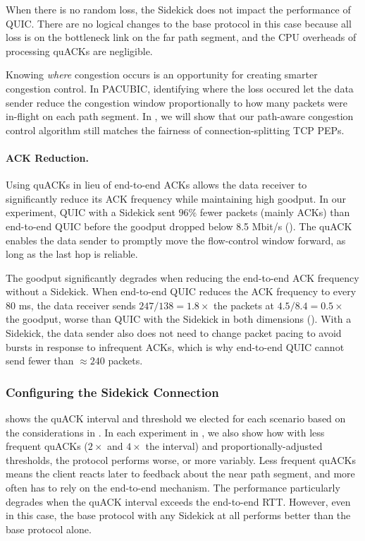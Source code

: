 When there is no random loss, the Sidekick does not impact the performance
of QUIC\@.
There are no logical changes to the base protocol in this case because all loss
is on the
bottleneck link on the far path segment, and the CPU overheads of processing quACKs
are negligible.

Knowing \emph{where} congestion occurs is an opportunity for creating smarter
congestion control. In PACUBIC, identifying where the loss occured let the data
sender reduce the congestion window proportionally to how many packets were
in-flight on each path segment. In , we
will show that our path-aware congestion control algorithm still matches the
fairness of connection-splitting TCP PEPs.

\paragraph{ACK Reduction.}

Using quACKs in lieu of end-to-end ACKs allows the data receiver to
significantly reduce its ACK frequency while maintaining high goodput.
In our experiment, QUIC with a Sidekick sent $96\%$ fewer packets (mainly ACKs)
than end-to-end QUIC before the goodput dropped below 8.5 Mbit/s
().
The quACK enables the data sender to promptly move the flow-control window forward,
as long as the last hop is reliable.

The goodput significantly degrades when reducing the end-to-end ACK frequency
without a Sidekick. When end-to-end QUIC reduces the ACK frequency to every
80 ms, the data receiver sends $247 / 138 = 1.8\times$ the packets at
$4.5 / 8.4 = 0.5\times$ the goodput, worse than QUIC with the Sidekick
in both dimensions (). With a Sidekick,
the data sender also does not need to change packet pacing to avoid bursts in
response to infrequent ACKs, which is why end-to-end QUIC cannot send fewer
than $\approx 240$ packets.

\subsubsection{Configuring the Sidekick Connection}
 shows the quACK interval and threshold we
elected for each scenario based on the considerations in
. In each experiment in ,
we also show how with less frequent quACKs ($2\times$ and $4\times$ the
interval) and proportionally-adjusted thresholds, the protocol performs worse,
or more variably. Less frequent quACKs means the client reacts later to
feedback about the near path segment, and more often has to rely on the
end-to-end mechanism. The performance particularly degrades when the quACK
interval exceeds the end-to-end RTT. However, even in this case, the base
protocol with any Sidekick at all performs better than the base protocol alone\@.

